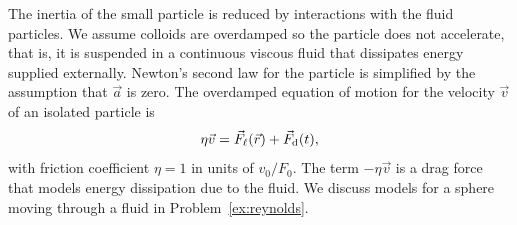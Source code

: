 \documentclass[preprint,showpacs,preprintnumbers,amsmath,amssymb,aps,prb]{revtex4-1}
\theoremstyle{remark}
\begin{document}
The inertia of the 
small particle is reduced by interactions
with the fluid particles.\cite{Purcell1977}
We assume 
colloids are
overdamped
so the particle does not accelerate,
that is, it is suspended in a continuous viscous fluid
that dissipates energy supplied externally. 
Newton's second law for the particle
is simplified
by the assumption that $\vec{a}$ is zero. 
The overdamped equation of motion for
the velocity $\vec{v}$ of 
an isolated particle is
\begin{equation}
  \eta \vec{v} = \vec{F}_{\ell}(\vec{r}) + \vec{F}_{\rm d}(t),
    \label{eq:motion}
\end{equation}
with friction coefficient $\eta = 1$ in units of $v_0 / F_0$.
The term $-\eta \vec{v}$
is a drag force that models
energy dissipation due to the fluid. 
We discuss  models for
a sphere moving through a fluid in 
Problem~\ref{ex:reynolds}. 
\end{document}
